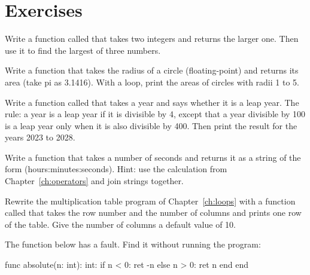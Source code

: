 \section*{Exercises}

\exercise Write a function called  that takes two integers
and returns the larger one. Then use it to find the largest of three
numbers.

\exercise Write a function that takes the radius of a circle (floating-point)
and returns its area (take pi as 3.1416). With a loop, print the areas of
circles with radii 1 to 5.

\exercise Write a function called  that takes a year and
says whether it is a leap year. The rule: a year is a leap year if it is
divisible by 4, except that a year divisible by 100 is a leap year only when
it is also divisible by 400. Then print the result for the years 2023 to
2028.

\exercise Write a function that takes a number of seconds and returns it as
a string of the form  (hours:minutes:seconds). Hint: use the
calculation from Chapter~\ref{ch:operators} and join strings together.

\exercise Rewrite the multiplication table program of Chapter~\ref{ch:loops} with a function called  that takes the row
number and the number of columns and prints one row of the table. Give the
number of columns a default value of 10.

\exercise The function below has a fault. Find it without running the
program:
\begin{salamcode}
func absolute(n: int): int:
    if n < 0:
        ret -n
    else n > 0:
        ret n
    end
end
\end{salamcode}
